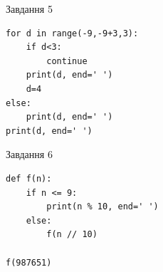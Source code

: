 \documentclass[12pt, ukrainian]{article}
\begin{document}
{\vspace{15mm}
\begin{minipage}[t]{9.7cm}                
{\begin{center}Завдання {5}\end{center}}
\begin{verbatim}
for d in range(-9,-9+3,3):
    if d<3:
        continue
    print(d, end=' ')
    d=4
else:
    print(d, end=' ')
print(d, end=' ')
\end{verbatim}     
\end{minipage}
\vline \hspace{8mm}
\begin{minipage}[t]{8.0cm}                
{\begin{center}Завдання {6}\end{center}}
\begin{verbatim}
def f(n):
    if n <= 9:
        print(n % 10, end=' ')
    else:
        f(n // 10)

f(987651)
\end{verbatim}     
\end{minipage}

}
\newpage
\end{document}
